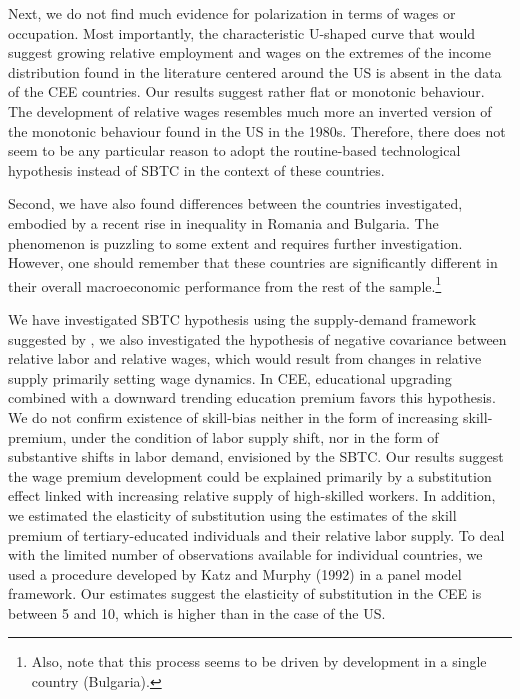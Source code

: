 \documentclass[11pt]{article}
\begin{document}
Next, we do not find much evidence for polarization in terms of wages or occupation. Most importantly, the characteristic U-shaped curve that would suggest growing relative employment and wages on the extremes of the income distribution found in the literature centered around the US is absent in the data of the CEE countries. Our results suggest rather flat or monotonic behaviour. The development of relative wages resembles much more an inverted version of the monotonic behaviour found in the US in the 1980s. Therefore, there does not seem to be any particular reason to adopt the routine-based technological hypothesis instead of SBTC in the context of these countries.

Second, we have also found differences between the countries investigated, embodied by a recent rise in inequality in Romania and Bulgaria. The phenomenon is puzzling to some extent and requires further investigation. However, one should remember that these countries are significantly different in their overall macroeconomic performance from the rest of the sample.\footnote{
Also, note that this process seems to be driven by development in a single country (Bulgaria).}

 We have investigated SBTC hypothesis using the supply-demand framework suggested by \citeauthor{katz1992changes}, we also investigated the hypothesis of negative covariance between relative labor and relative wages, which would result from changes in relative supply primarily setting wage dynamics. In CEE, educational upgrading combined with a downward trending education premium favors this hypothesis. 
 We do not confirm existence of skill-bias neither in the form of increasing skill-premium, under the condition of labor supply shift, nor in the form of substantive shifts in labor demand, envisioned by the SBTC. Our results suggest the wage premium  development could be explained primarily by a substitution effect linked with increasing relative supply of high-skilled workers. In addition, we estimated the elasticity of substitution using the estimates of the skill premium of tertiary-educated individuals and their relative labor supply. To deal with the limited number of observations available for individual countries, we used a procedure developed by Katz and Murphy (1992) in a panel model framework. Our estimates suggest the elasticity of substitution in the CEE is between 5 and 10, which is higher than in the case of the US.
\end{document}
